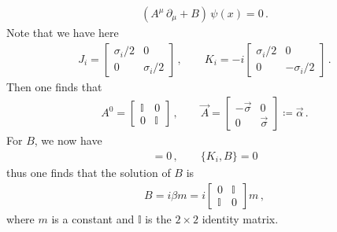\documentclass[11pt, onesided]{book}
\theoremstyle{break}
\theoremstyle{break}
\newcommand{\pd}{\partial}
\newcommand{\bmat}[1]{\begin{bmatrix} #1 \end{bmatrix}}
\begin{document}
\begin{align*}
(A^\mu \, \pd_\mu + B) \, \psi(x) = 0\,.
\end{align*}
Note that we have here
\begin{align*}
J_i = \bmat{\sigma_i/2 & 0 \\ 0 & \sigma_i/2}\,,\qquad
K_i = -i \bmat{\sigma_i/2 & 0 \\ 0 & -\sigma_i/2}\,.
\end{align*}
Then one finds that
\begin{align*}
A^0 = \bmat{\mathbb{I} & 0 \\ 0 & \mathbb{I}}\,, \qquad \vec{A} = \bmat{-\vec{\sigma} & 0 \\ 0 & \vec{\sigma}} \coloneqq \vec{\alpha}\,.
\end{align*}
For $B$, we now have
\begin{align*}
[J_i, B] = 0\,,\qquad\{K_i, B\} = 0
\end{align*}
thus one finds that the solution of $B$ is 
\begin{align*}
B = i\beta m = i \bmat{0 & \mathbb{I} \\ \mathbb{I}& 0} m\,,
\end{align*}
where $m$ is a constant and $\mathbb{I}$ is the $2\times 2$ identity matrix. \\
\end{document}
